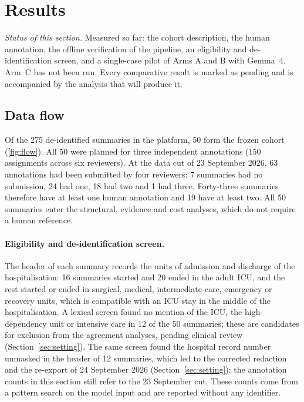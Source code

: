 \section{Results}\label{sec:results}

\noindent\emph{Status of this section.} Measured so far: the cohort description, the human annotation, the
offline verification of the pipeline, an eligibility and de-identification screen, and a single-case pilot of
Arms A and B with Gemma~4. Arm~C has not been run. Every comparative result is marked as pending and is
accompanied by the analysis that will produce it.

\subsection{Data flow}

Of the 275 de-identified summaries in the platform, 50 form the frozen cohort (\cref{fig:flow}). All
50 were planned for three independent annotations (150 assignments across six reviewers). At the data
cut of 23 September 2026, 63 annotations had been submitted by four reviewers: 7 summaries had no
submission, 24 had one, 18 had two and 1 had three. Forty-three summaries therefore have at least one
human annotation and 19 have at least two. All 50 summaries enter the structural, evidence and cost
analyses, which do not require a human reference.

\paragraph{Eligibility and de-identification screen.} The header of each summary records the units of
admission and discharge of the hospitalisation: 16 summaries started and 20 ended in the adult ICU, and the
rest started or ended in surgical, medical, intermediate-care, emergency or recovery units, which is
compatible with an ICU stay in the middle of the hospitalisation. A lexical screen found no mention of the
ICU, the high-dependency unit or intensive care in 12 of the 50 summaries; these are candidates for
exclusion from the agreement analyses, pending clinical review (Section~\ref{sec:setting}). The same screen
found the hospital record number unmasked in the header of 12 summaries, which led to the corrected
redaction and the re-export of 24 September 2026 (Section~\ref{sec:setting}); the annotation counts in this
section still refer to the 23 September cut. These counts come from a pattern search on the model
input and are reported without any identifier.

